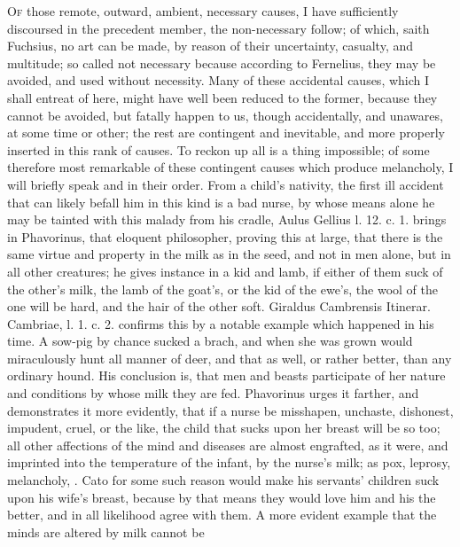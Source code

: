 {\lettrine{O}{f} those remote, outward, ambient, necessary causes, I have
sufficiently discoursed in the precedent member, the non-necessary
follow; of which, saith Fuchsius, no art can be made, by reason
of their uncertainty, casualty, and multitude; so called not necessary
because according to Fernelius, they may be avoided, and used
without necessity. Many of these accidental causes, which I shall
entreat of here, might have well been reduced to the former, because
they cannot be avoided, but fatally happen to us, though accidentally,
and unawares, at some time or other; the rest are contingent and
inevitable, and more properly inserted in this rank of causes. To
reckon up all is a thing impossible; of some therefore most remarkable
of these contingent causes which produce melancholy, I will briefly
speak and in their order.
From a child's nativity, the first ill accident that can likely befall
him in this kind is a bad nurse, by whose means alone he may be tainted
with this malady from his cradle, Aulus Gellius l. 12. c. 1.
brings in Phavorinus, that eloquent philosopher, proving this at large,
 that there is the same virtue and property in the milk as in the
seed, and not in men alone, but in all other creatures; he gives
instance in a kid and lamb, if either of them suck of the other's milk,
the lamb of the goat's, or the kid of the ewe's, the wool of the one
will be hard, and the hair of the other soft. Giraldus Cambrensis
Itinerar. Cambriae, l. 1. c. 2. confirms this by a notable example
which happened in his time. A sow-pig by chance sucked a brach, and
when she was grown would miraculously hunt all manner of deer,
and that as well, or rather better, than any ordinary hound. His
conclusion is, that men and beasts participate of her nature and
conditions by whose milk they are fed. Phavorinus urges it farther, and
demonstrates it more evidently, that if a nurse be misshapen,
unchaste, dishonest, impudent, cruel, or the like, the child that
sucks upon her breast will be so too; all other affections of the mind
and diseases are almost engrafted, as it were, and imprinted into the
temperature of the infant, by the nurse's milk; as pox, leprosy,
melancholy, \etc{}. Cato for some such reason would make his servants'
children suck upon his wife's breast, because by that means they would
love him and his the better, and in all likelihood agree with them. A
more evident example that the minds are altered by milk cannot be
}
